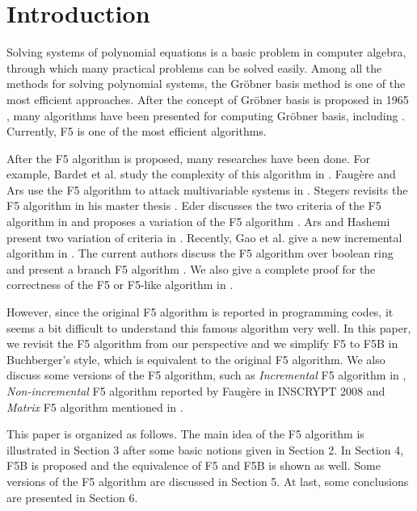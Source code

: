 \documentclass[preprint,authoryear,3p,12pt]{elsarticle}
\def\gr{{Gr\"obner }}
\begin{document}




\section{Introduction} \label{sec-introduction}


Solving systems of polynomial equations is a basic problem in computer algebra, through which many practical problems can be
solved easily. Among all the methods for solving polynomial systems, the \gr basis method is one of the most efficient
approaches. After the concept of \gr basis is proposed in 1965 \citep{Buchberger65}, many algorithms have been presented for
computing \gr basis, including \citep{Lazard83, GebMol86, Gio91, Mora92, Fau99, Fau02}. Currently,   F5   is one of the most
efficient algorithms.

After the F5 algorithm is proposed, many researches have been done.
For example, Bardet et al. study the complexity of this algorithm in
\citep{Bardet03}. Faug\`ere and Ars use the F5 algorithm to attack
multivariable systems in \citep{Fau03}. Stegers revisits the F5
algorithm in his master thesis \citep{Stegers05}. Eder discusses the
two criteria of the F5 algorithm in \citep{Eder08} and proposes a
variation of the F5 algorithm \citep{Eder09}. Ars and Hashemi
present two variation of criteria in \citep{Ars09}. Recently, Gao et
al. give a new incremental algorithm in \citep{Gao09}. The current
authors discuss the F5 algorithm over boolean ring and present a
branch F5 algorithm \citep{SunWang09a, SunWang09b}. We also give a
complete proof for the correctness of the F5 or F5-like algorithm in
\citep{SunWang10}.

However, since the original F5 algorithm is reported in programming codes, it seems a bit difficult to understand this famous
algorithm very well. In this paper, we revisit the F5 algorithm from our perspective and we simplify F5 to F5B in Buchberger's
style,    which is equivalent to the original F5 algorithm.  We also discuss some versions of the F5 algorithm, such as {\it
Incremental} F5 algorithm in \citep{Fau02}, {\it Non-incremental} F5 algorithm reported by Faug\`ere in INSCRYPT 2008 and {\it
Matrix} F5 algorithm mentioned in \citep{Bardet03}.

This paper is organized as follows. The main idea of the F5 algorithm is illustrated in Section 3 after some basic notions given
in Section 2. In Section 4,  F5B  is proposed  and   the equivalence of  F5 and F5B is shown as well. Some versions of the F5
algorithm are discussed in Section 5. At last, some conclusions are presented in Section 6.
\end{document}
